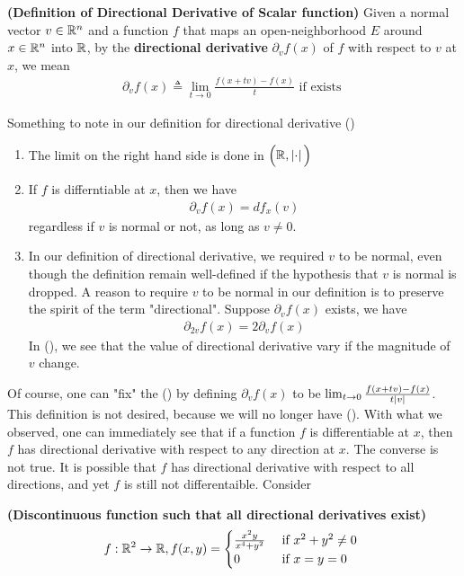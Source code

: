 \documentclass{report}
\begin{document}
\begin{definition}
\label{DoDDoS}
\textbf{(Definition of Directional Derivative of Scalar function)} Given a normal vector $v \in\mathbb{R}^n$ and a function $f$ that maps an open-neighborhood $E$ around  $x \in\mathbb{R}^n$ into $\mathbb{R}$, by the \textbf{directional derivative} $\partial _v f(x)$ of $f$ with respect to $v$ at $x$, we mean
\begin{align*}
\partial_v f(x)\triangleq \lim_{t\to 0} \frac{f(x+tv)-f(x)}{t}\text{ if exists }
\end{align*}
\end{definition}
\begin{mdframed}
Something to note in our definition for directional derivative ()
\begin{enumerate}[label=(\alph*)]
  \item The limit on the right hand side is done in $\Big(\mathbb{R} ,\left|\cdot\right|\Big)$ 
  \item If $f$ is differntiable at  $x$, then we have
    \begin{align}
    \label{pavfx}
    \partial_v f(x)=df_x(v)
    \end{align}
  regardless if $v$ is normal or not, as long as $v\neq 0$. 
  \item In our definition of directional derivative, we required $v$ to be normal, even though the definition remain well-defined if the hypothesis that $v$ is normal is dropped. A reason to require $v$ to be normal in our definition is to preserve the spirit of the term "directional". Suppose $\partial_v f(x)$ exists, we have 
\begin{align}
\label{pa2v}
\partial_{2v}f(x)=2\partial_v f(x)
\end{align}
In (), we see that the value of directional derivative vary if the magnitude of $v$ change.
\end{enumerate}
Of course, one can "fix" the  () by defining $\partial_vf(x)$ to be $\lim_{t\to 0}\frac{f(x+tv)-f(x)}{t \left|v\right|}$. This definition is not desired, because we will no longer have (). With what we observed, one can immediately see that if a function $f$ is differentiable at $x$, then $f$ has directional derivative with respect to any direction at $x$. The converse is not true. It is possible that  $f$ has directional derivative with respect to all directions, and yet $f$ is still not differentaible. Consider 
\begin{Example}{\textbf{(Discontinuous function such that all directional derivatives exist)}}{}
\begin{align*}
f:\mathbb{R}^2 \rightarrow \mathbb{R}, f(x,y)=\begin{cases}
 \frac{x^2y}{x^4+y^2} & \text{ if $x^2+y^2\neq 0$ }\\
 0& \text{ if $x=y=0$ }
\end{cases}
\end{align*}
\end{Example}
\end{mdframed}
\end{document}
